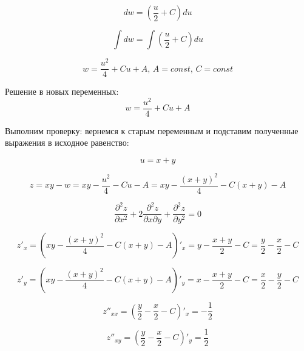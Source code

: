 \documentclass[a5paper, 10pt]{article}
\theoremstyle{definition}
\theoremstyle{plain}
\theoremstyle{remark}
\begin{document}
\begin{equation}
 dw = \left( \frac{u}{2} + C \right) du
\end{equation}

\begin{equation}
 \int dw =\int  \left( \frac{u}{2} + C \right) du
\end{equation}

\begin{equation}
 w =  \frac{u^2}{4} + Cu + A, \, A = const, \, C = const
\end{equation}

Решение в новых переменных:
\begin{equation}
 w =  \frac{u^2}{4} + Cu + A
\end{equation}

Выполним проверку: вернемся к старым переменным и подставим полученные выражения в исходное равенство:


\begin{equation}
u = x + y
\end{equation}

\begin{equation}
z = xy - w = xy -  \frac{u^2}{4} - Cu - A =  xy -  \frac{( x + y)^2}{4} - C( x + y) - A
\end{equation}

\begin{equation}
\frac{\partial^2 z}{\partial x^2} + 2 \frac{\partial^2 z}{\partial x \partial y} + \frac{\partial^2 z}{\partial y^2} = 0
\end{equation}

\begin{equation}
z'_x = \left(  xy -  \frac{( x + y)^2}{4} - C( x + y) - A \right)'_x = y - \frac{ x + y}{2}  -C = \frac{y}{2} - \frac{ x}{2} -C
\end{equation}

\begin{equation}
z'_y = \left(  xy -  \frac{( x + y)^2}{4} - C( x + y) - A \right)'_y = x - \frac{ x + y}{2}  -C = \frac{x}{2} - \frac{y}{2} -C
\end{equation}

\begin{equation}
z''_{xx} = \left(  \frac{y}{2} - \frac{ x}{2} -C \right)'_x =  - \frac{ 1}{2}
\end{equation}

\begin{equation}
z''_{xy} = \left(  \frac{y}{2} - \frac{ x}{2} -C \right)'_y =   \frac{ 1}{2}
\end{equation}
\end{document}
